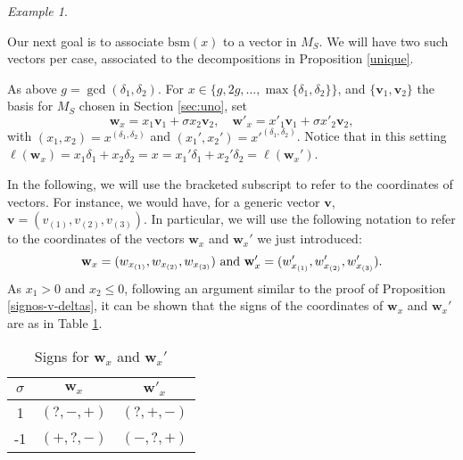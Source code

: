 \documentclass[11pt]{amsart}
\theoremstyle{remark}
\newtheorem{example}[theorem]{Example}
\begin{document}
\begin{example}

\end{example}

Our next goal is to associate $\mathrm{bsm}(x)$ to a vector in $M_S$. We will have two such vectors per case, associated to the decompositions in Proposition \ref{unique}.

As above $g=\gcd(\delta_1,\delta_2)$. For  $x\in \{g,2g,\ldots,\max\{\delta_1,\delta_2\}\}$, and $\{\mathbf v_1, \mathbf v_2\}$ the basis for $M_S$ chosen in Section \ref{sec:uno}, set 
\begin{equation}\label{w-x}
\mathbf w_x=x_1\mathbf v_1+\sigma x_2\mathbf v_2, \quad \mathbf w'_x=x'_1\mathbf v_1+ \sigma x'_2\mathbf v_2,
\end{equation}
with $(x_1,x_2)=x^{(\delta_1,\delta_2)}$ and $(x_1',x_2')=x'^{(\delta_1,\delta_2)}$.
Notice that in this setting  $\ell(\mathbf w_x)=x_1\delta_1+x_2\delta_2= x= x_1'\delta_1+x_2'\delta_2=\ell(\mathbf w_{x}')$.

In the following, we will use the bracketed subscript to refer to the coordinates of vectors. For instance, we would have, for a generic vector $\mathbf v$, $\mathbf v=(v_{(1)},v_{(2)},v_{(3)})$. In particular,  
we will use the following notation to refer to the coordinates of the vectors $\mathbf w_x$ and $\mathbf w_x'$ we just introduced: 
\[\mathbf w_x=(w_{x_{(1)}},w_{x_{(2)}},w_{x_{(3)}}) \hbox{ and }\mathbf w_x'=(w_{x_{(1)}}',w_{x_{(2)}}',w_{x_{(3)}}').\]
As $x_1>0$ and $x_2\le 0$, following an argument similar to the proof of Proposition \ref{signos-v-deltas}, it can be shown that the signs of the coordinates of $\mathbf w_x$ and $\mathbf w_x'$ are as in Table \ref{signs-vx}.
\begin{table}[h]
\begin{center}
\begin{tabular}{c|cc}
$\sigma$   & $\mathbf w_x$ & $\mathbf w'_x$ \\
\hline
1 & $(?,-,+)$ & $(?,+,-)$ \\
-1  & $(+,?,-)$ & $(-,?,+)$ 
\end{tabular}
\end{center}
\caption{Signs for $\mathbf w_x$ and $\mathbf w_x'$}
\label{signs-vx}
\end{table}
\end{document}

